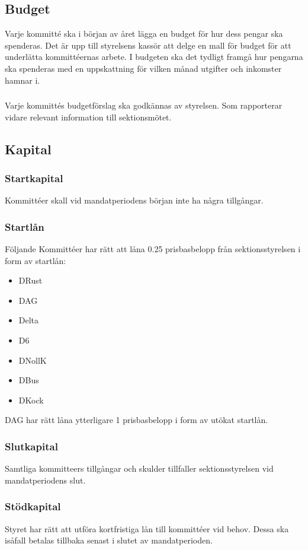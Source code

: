 \documentclass[a4paper, 10pt]{article}
\def\roundandprint #1{\xinttheiexpr #1\relax }
\newcommand{\prisbasbelopp}[1]{
    #1 prisbasbelopp 
    \ifdef{\nuvarandeprisbasbelopp}{
        \marginpar{
            \small{ \textbf{\roundandprint{\xintiexpr#1 * \nuvarandeprisbasbelopp\relax}kr}}
        }
    }{}
}
\begin{document}
\subsection{Budget}
\label{sec:budget}
Varje kommitté ska i början av året lägga en budget för hur dess pengar ska spenderas. Det är upp till styrelsens kassör att delge en mall för budget för att underlätta kommittéernas arbete. I budgeten ska det tydligt framgå hur pengarna ska spenderas med en uppskattning för vilken månad utgifter och inkomster hamnar i. 

\subsubsection{}
Varje kommittés budgetförslag ska godkännas av styrelsen. Som rapporterar vidare relevant information till sektionsmötet.


\subsection{Kapital}
\label{sec:sektionsforeningar_startkapital}
\subsubsection{Startkapital}
Kommittéer skall vid mandatperiodens början inte ha några tillgångar. 
\subsubsection{Startlån}
Följande Kommittéer har rätt att låna \prisbasbelopp{0.25} från sektionsstyrelsen i form av startlån: 
\begin{itemize}
  \item DRust
  \item DAG
  \item Delta
  \item D6
  \item DNollK
  \item DBus
  \item DKock
\end{itemize}
DAG har rätt låna ytterligare \prisbasbelopp{1} i form av utökat startlån.
\subsubsection{Slutkapital}
Samtliga kommitteers tillgångar och skulder tillfaller sektionsstyrelsen vid mandatperiodens slut.
\subsubsection{Stödkapital}
Styret har rätt att utföra kortfristiga lån till kommittéer vid behov. Dessa ska isåfall betalas tillbaka senast i slutet av mandatperioden.
\end{document}
